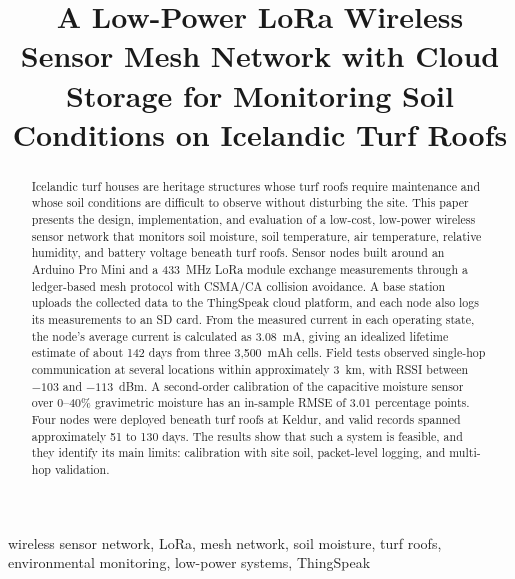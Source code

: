 \documentclass[conference]{IEEEtran}
\begin{document}
\title{A Low-Power LoRa Wireless Sensor Mesh Network with Cloud Storage for Monitoring Soil Conditions on Icelandic Turf Roofs}

\author{
}

\maketitle

\begin{abstract}
Icelandic turf houses are heritage structures whose turf roofs require maintenance and whose soil conditions are difficult to observe without disturbing the site. This paper presents the design, implementation, and evaluation of a low-cost, low-power wireless sensor network that monitors soil moisture, soil temperature, air temperature, relative humidity, and battery voltage beneath turf roofs. Sensor nodes built around an Arduino Pro Mini and a 433~MHz LoRa module exchange measurements through a ledger-based mesh protocol with CSMA/CA collision avoidance. A base station uploads the collected data to the ThingSpeak cloud platform, and each node also logs its measurements to an SD card. From the measured current in each operating state, the node's average current is calculated as 3.08~mA, giving an idealized lifetime estimate of about 142 days from three 3,500~mAh cells. Field tests observed single-hop communication at several locations within approximately 3~km, with RSSI between $-103$ and $-113$~dBm. A second-order calibration of the capacitive moisture sensor over 0--40\% gravimetric moisture has an in-sample RMSE of 3.01 percentage points. Four nodes were deployed beneath turf roofs at Keldur, and valid records spanned approximately 51 to 130 days. The results show that such a system is feasible, and they identify its main limits: calibration with site soil, packet-level logging, and multi-hop validation.
\end{abstract}

\begin{IEEEkeywords}
wireless sensor network, LoRa, mesh network, soil moisture, turf roofs, environmental monitoring, low-power systems, ThingSpeak
\end{IEEEkeywords}
\end{document}
